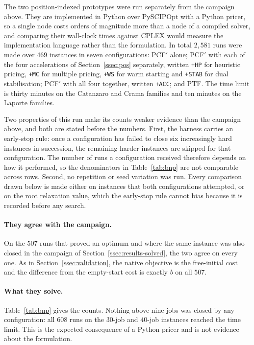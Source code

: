The two position-indexed prototypes were run separately from the campaign above. They
are implemented in Python over PySCIPOpt with a Python pricer, so a single node costs
orders of magnitude more than a node of a compiled solver, and comparing their
wall-clock times against CPLEX would measure the implementation language rather than
the formulation. In total $2{,}581$ runs were made over $469$ instances in seven
configurations: PCF$'$ alone; PCF$'$ with each of the four accelerations of
Section~\ref{ssec:pos} separately, written \texttt{+HP} for heuristic pricing,
\texttt{+MC} for multiple pricing, \texttt{+WS} for warm starting and \texttt{+STAB}
for dual stabilisation; PCF$'$ with all four together, written \texttt{+ACC}; and PTF.
The time limit is thirty minutes on the Catanzaro and Crama families and ten minutes on
the Laporte families.

Two properties of this run make its counts weaker evidence than the campaign above, and
both are stated before the numbers. First, the harness carries an early-stop rule: once
a configuration has failed to close six increasingly hard instances in succession, the
remaining harder instances are skipped for that configuration. The number of runs a
configuration received therefore depends on how it performed, so the denominators in
Table~\ref{tab:bnp} are not comparable across rows. Second, no repetition or seed
variation was run. Every comparison drawn below is made either on instances that both
configurations attempted, or on the root relaxation value, which the early-stop rule
cannot bias because it is recorded before any search.

\paragraph{They agree with the campaign.}
On the $507$ runs that proved an optimum and where the same instance was also closed in
the campaign of Section~\ref{ssec:results-solved}, the two agree on every one. As in
Section~\ref{ssec:validation}, the native objective is the free-initial cost and the
difference from the empty-start cost is exactly $b$ on all $507$.

\paragraph{What they solve.}
Table~\ref{tab:bnp} gives the counts. Nothing above nine jobs was closed by any
configuration: all $608$ runs on the $30$-job and $40$-job instances reached the time
limit. This is the expected consequence of a Python pricer and is not evidence about
the formulation.

